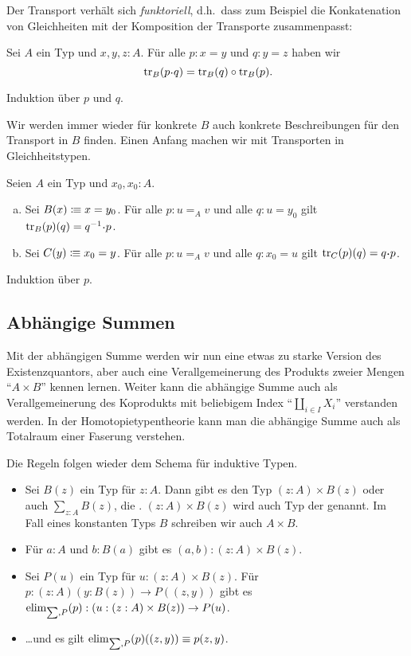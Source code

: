 Der Transport verhält sich \emph{funktoriell}, d.h.\ dass zum Beispiel die Konkatenation von Gleichheiten mit der Komposition der Transporte zusammenpasst:

\begin{lemma}
  Sei $A$ ein Typ und $x,y,z:A$. Für alle $p:x=y$ und $q:y=z$ haben wir
  \[
    \transp_B(p\kon q) = \transp_B(q) \circ \transp_B(p)\rlap{.}
  \]
\end{lemma}
\begin{beweis}
  Induktion über $p$ und $q$.
\end{beweis}

Wir werden immer wieder für konkrete $B$ auch konkrete Beschreibungen für den Transport in $B$ finden.
Einen Anfang machen wir mit Transporten in Gleichheitstypen.

\begin{lemma}
  \label{transport-gleichheitstyp}
  Seien $A$ ein Typ und $x_0,x_0:A$.
  \begin{enumerate}[(a)]
  \item Sei $B(x)\vcentcolon\mspace{-1.2mu}\equiv x=y_0$. Für alle $p:u=_Av$ und alle $q:u=y_0$ gilt $\transp_B(p)(q)=q^{-1}\kon p$.
  \item Sei $C(y)\vcentcolon\mspace{-1.2mu}\equiv x_0=y$. Für alle $p:u=_Av$ und alle $q:x_0=u$ gilt $\transp_C(p)(q)=q\kon p$.
  \end{enumerate}
\end{lemma}
\begin{beweis}
  Induktion über $p$.
\end{beweis}

\subsection{Abhängige Summen}
Mit der abhängigen Summe werden wir nun eine etwas zu starke Version des Existenzquantors, aber auch eine Verallgemeinerung des Produkts zweier Mengen ``$A\times B$'' kennen lernen.
Weiter kann die abhängige Summe auch als Verallgemeinerung des Koprodukts mit beliebigem Index ``$\coprod_{i\in I}X_i$'' verstanden werden.
In der Homotopietypentheorie kann man die abhängige Summe auch als Totalraum einer Faserung verstehen.

Die Regeln folgen wieder dem Schema für induktive Typen.

\begin{regeln}
\begin{itemize}
\item Sei $B(z)$ ein Typ für $z:A$. Dann gibt es den Typ $(z:A)\times B(z)$ oder auch $\sum_{z:A}B(z)$,
  die .
  $(z:A)\times B(z)$ wird auch Typ der  genannt.
  Im Fall eines konstanten Typs $B$ schreiben wir auch $A\times B$.
\item Für $a:A$ und $b:B(a)$ gibt es $(a,b):(z:A)\times B(z)$.
\item Sei $P(u)$ ein Typ für $u:(z:A)\times B(z)$.
  Für $p:(z:A) (y : B(z)) \to P((z,y))$ gibt es $\mathrm{elim}_{\sum,P}(p):(u:(z:A)\times B(z))\to P(u)$.
\item \dots und es gilt $\mathrm{elim}_{\sum,P}(p)((z,y))\equiv p(z,y)$.
\end{itemize}
\end{regeln}

